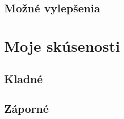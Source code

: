 \documentclass{article}
\begin{document}
\subsection{Možné vylepšenia}

\newpage
\section{Moje skúsenosti}
\subsection{Kladné}
\subsection{Záporné}

\newpage
\renewcommand\refname{Referencie}
{}

\nocite{*}
\end{document}
